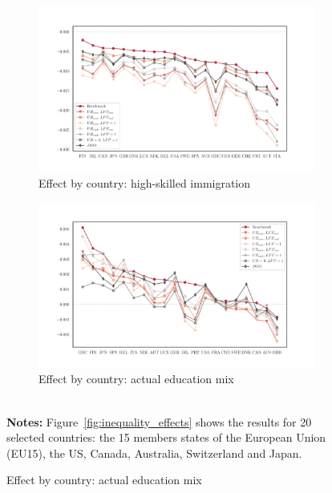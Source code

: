 \documentclass[a4paper,12pt]{article}
\begin{document}
{\begin{landscape}
\begin{center}
\begin{figure}[htb!]
\begin{subfigure}{.45\linewidth}
  \centering
     \caption{Effect by country: high-skilled immigration} \label{fig:inequality_effects_c}
  \includegraphics[width=\linewidth]{graphs/Ineq_HS.pdf}
\end{subfigure}
\hfill
\begin{subfigure}{.45\linewidth}
  \centering
    \caption{Effect by country: actual education mix} \label{fig:inequality_effects_d}
  \includegraphics[width=\linewidth]{graphs/Ineq_LS+HS.pdf}
\end{subfigure}
\\[0.5cm]
{\footnotesize \textbf{Notes:} Figure~\ref{fig:inequality_effects} shows the results for 20 selected countries: the 15 members states of the European Union (EU15), the US, Canada, Australia, Switzerland and Japan. }
\end{figure}
\end{center}
\end{landscape}
\restoregeometry } 
\end{document}
